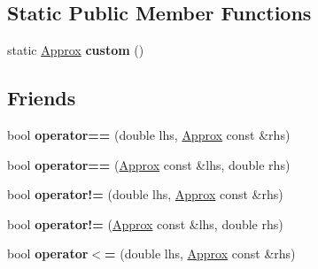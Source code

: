 \subsection*{Static Public Member Functions}
\begin{DoxyCompactItemize}
\item 
\mbox{\label{classCatch_1_1Detail_1_1Approx_aaf86dc0ee92272ac2d9839197a07951d}} 
static \hyperlink{classCatch_1_1Detail_1_1Approx}{Approx} {\bfseries custom} ()
\end{DoxyCompactItemize}
\subsection*{Friends}
\begin{DoxyCompactItemize}
\item 
\mbox{\label{classCatch_1_1Detail_1_1Approx_ac766f044f1c63f0c5997982baefd9049}} 
bool {\bfseries operator==} (double lhs, \hyperlink{classCatch_1_1Detail_1_1Approx}{Approx} const \&rhs)
\item 
\mbox{\label{classCatch_1_1Detail_1_1Approx_a35999631e6cef569f9da9f3fa910db22}} 
bool {\bfseries operator==} (\hyperlink{classCatch_1_1Detail_1_1Approx}{Approx} const \&lhs, double rhs)
\item 
\mbox{\label{classCatch_1_1Detail_1_1Approx_a83b3763569a7ecc143c335b630be0e47}} 
bool {\bfseries operator!=} (double lhs, \hyperlink{classCatch_1_1Detail_1_1Approx}{Approx} const \&rhs)
\item 
\mbox{\label{classCatch_1_1Detail_1_1Approx_a7497ef839f8026cc0edd6269a80f3e09}} 
bool {\bfseries operator!=} (\hyperlink{classCatch_1_1Detail_1_1Approx}{Approx} const \&lhs, double rhs)
\item 
\mbox{\label{classCatch_1_1Detail_1_1Approx_aa2bfad80c8c138eac1f0b56910a7d3f2}} 
bool {\bfseries operator$<$=} (double lhs, \hyperlink{classCatch_1_1Detail_1_1Approx}{Approx} const \&rhs)
\item 
\mbox{\label{classCatch_1_1Detail_1_1Approx_a75c9382b61421ffab3559c3506182d8f}} 

\end{DoxyCompactItemize}
